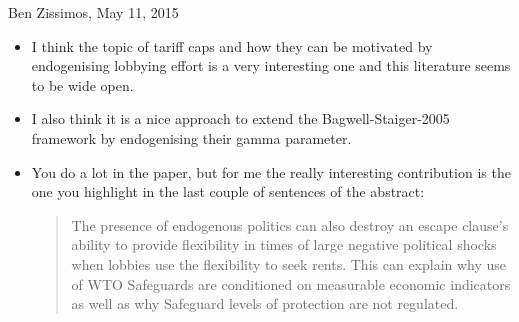 \documentclass[12pt]{article}
\begin{document}
\newpage
Ben Zissimos, May 11, 2015

\begin{itemize}
	\item I think the topic of tariff caps and how they can be motivated by endogenising lobbying effort is a very interesting one and this literature seems to be wide open.
	\item I also think it is a nice approach to extend the Bagwell-Staiger-2005 framework by endogenising their gamma parameter.
	\item You do a lot in the paper, but for me the really interesting contribution is the one you highlight in the last couple of sentences of the abstract:
\begin{quote}
The presence of endogenous politics can also destroy an escape clause's ability to provide flexibility in times of large negative political shocks when lobbies use the flexibility to seek rents. This can explain why use of WTO Safeguards are conditioned on measurable economic indicators as well as why Safeguard levels of protection are not regulated.
\end{quote}
\end{itemize}
 
\end{document}
